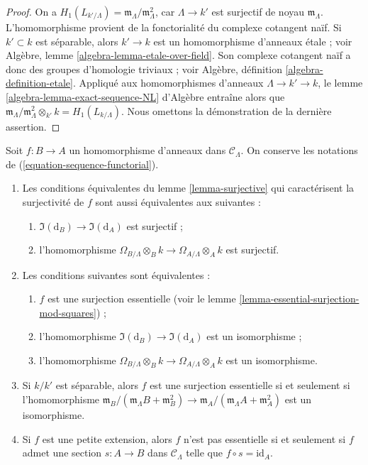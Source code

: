\begin{proof}
On a $H_1(L_{k'/\Lambda}) = \mathfrak m_\Lambda/\mathfrak m_\Lambda^2$, car
$\Lambda \to k'$ est surjectif de noyau $\mathfrak m_\Lambda$.
L'homomorphisme provient de la fonctorialité du complexe cotangent naïf.
Si $k' \subset k$ est séparable, alors $k' \to k$ est un homomorphisme
d'anneaux \'etale ; voir Algèbre, lemme
\ref{algebra-lemma-etale-over-field}. Son complexe cotangent naïf a donc des
groupes d'homologie triviaux ; voir Algèbre, définition
\ref{algebra-definition-etale}. Appliqué aux homomorphismes d'anneaux
$\Lambda \to k' \to k$, le lemme
\ref{algebra-lemma-exact-sequence-NL} d'Algèbre entraîne alors que
$\mathfrak m_\Lambda/\mathfrak m_\Lambda^2 \otimes_{k'} k = H_1(L_{k/\Lambda})$.
Nous omettons la démonstration de la dernière assertion.
\end{proof}

\begin{lemma}
\label{lemma-essential-surjection}
Soit $f: B \to A$ un homomorphisme d'anneaux dans $\mathcal{C}_\Lambda$.
On conserve les notations de (\ref{equation-sequence-functorial}).
\begin{enumerate}
\item Les conditions équivalentes du lemme \ref{lemma-surjective} qui
caractérisent la surjectivité de $f$ sont aussi équivalentes aux suivantes :
\begin{enumerate}
\item $\Im(\text{d}_B) \to \Im(\text{d}_A)$ est surjectif ;
\item l'homomorphisme $\Omega_{B/\Lambda} \otimes_B k \to
\Omega_{A/\Lambda} \otimes_A k$ est surjectif.
\end{enumerate}
\item Les conditions suivantes sont équivalentes :
\begin{enumerate}
\item $f$ est une surjection essentielle (voir le lemme
\ref{lemma-essential-surjection-mod-squares}) ;
\item l'homomorphisme $\Im(\text{d}_B) \to \Im(\text{d}_A)$ est un
isomorphisme ;
\item l'homomorphisme $\Omega_{B/\Lambda} \otimes_B k \to
\Omega_{A/\Lambda} \otimes_A k$ est un isomorphisme.
\end{enumerate}
\item Si $k/k'$ est séparable, alors $f$ est une surjection essentielle si et
seulement si l'homomorphisme
$\mathfrak m_B/(\mathfrak m_\Lambda B + \mathfrak m_B^2) \to
\mathfrak m_A/(\mathfrak m_\Lambda A + \mathfrak m_A^2)$
est un isomorphisme.
\item Si $f$ est une petite extension, alors $f$ n'est pas essentielle si et
seulement si $f$ admet une section $s: A \to B$ dans $\mathcal{C}_\Lambda$
telle que $f \circ s = \text{id}_A$.
\end{enumerate}
\end{lemma}

